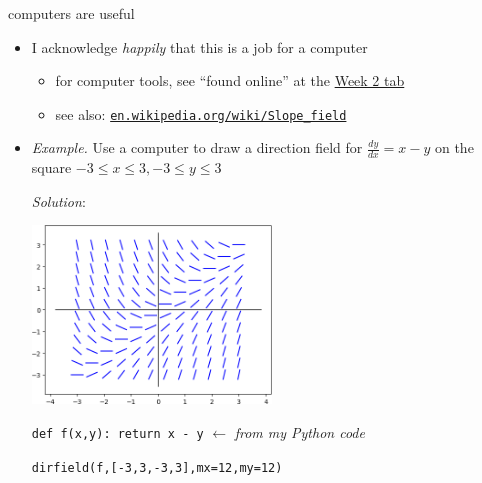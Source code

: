 \documentclass{beamer}
\begin{document}
\begin{frame}{computers are useful}

\begin{itemize}
\item I acknowledge \emph{happily} that this is a job for a computer
    \begin{itemize}
    \item for computer tools,  see ``found online'' at the \href{https://bueler.github.io/math302/week2.html}{\color{cyan} Week 2 tab}
    \item see also: \href{https://en.wikipedia.org/wiki/Slope_field}{\color{cyan} \texttt{en.wikipedia.org/wiki/Slope\_field}}
    \end{itemize}

\medskip
\item \emph{Example.}  Use a computer to draw a direction field for
$\frac{dy}{dx} = x-y$ on the square $-3 \le x \le 3, -3 \le y \le 3$

\bigskip
\emph{Solution}:

\vspace{-3mm}
\hfill \includegraphics[width=0.5\textwidth]{figs/example-field} \phantom{as dfjadl dsf}

\medskip
\scriptsize
\texttt{def f(x,y):  return x - y}  \hfill $\longleftarrow$ \emph{from my Python code}

\texttt{dirfield(f,[-3,3,-3,3],mx=12,my=12)}
\end{itemize}
\end{frame}
\end{document}
